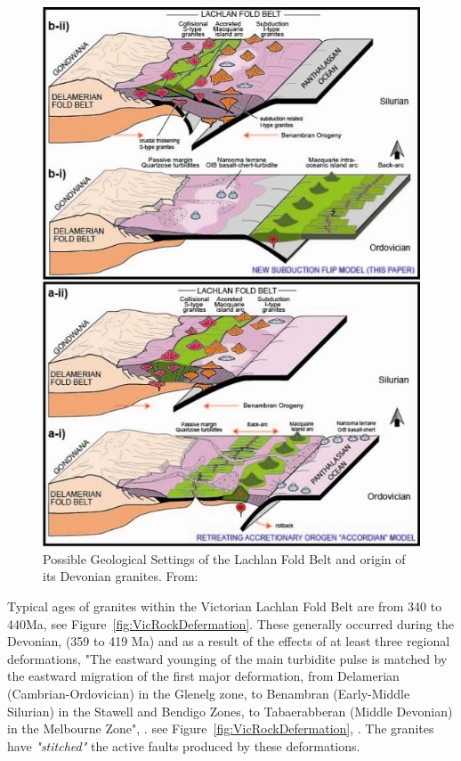 \documentclass[a4paper]{article}
\begin{document}
\begin{figure}[H]
\centering
\includegraphics[width=1\textwidth]{granite_models.jpg}
\caption{\label{fig:GraniteModels} Possible Geological Settings of the Lachlan Fold Belt and origin of its Devonian granites. From: \cite{aitchison2012accordion}}
\end{figure}


Typical ages of granites within the Victorian Lachlan Fold Belt are from 340 to 440Ma, see  Figure~\ref{fig:VicRockDefermation}. These generally occurred during the Devonian, (359 to 419 Ma) and as a result of the effects of at least three regional deformations, "The eastward younging of the main turbidite pulse is matched by the eastward migration of the first major deformation, from Delamerian (Cambrian-Ordovician) in the Glenelg zone, to Benambran (Early-Middle Silurian) in the Stawell and Bendigo Zones, to Tabaerabberan (Middle Devonian) in the Melbourne Zone", \cite{moorel1998palaeozoic}. see  Figure~\ref{fig:VicRockDefermation}, \cite{moorel1998palaeozoic}. The granites have \textit{"stitched"} the active faults produced by these deformations.
\end{document}
